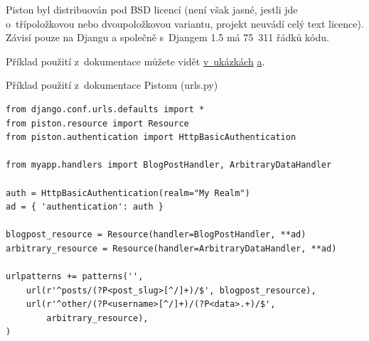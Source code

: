 Piston byl distribuován pod BSD licencí (není však jasné, jestli jde o~třípoložkovou \autocite{BSD3} nebo dvoupoložkovou \autocite{BSD2} variantu, projekt neuvádí celý text licence). Závisí pouze na Djangu a společně s~Djangem 1.5 má 75~311 řádků kódu.

Příklad použití z~dokumentace můžete vidět \protect\hyperlink{code:piston1}{v~ukázkách} \protect\hyperlink{code:piston2}{a}.

\begin{listing}[htbp]
\caption{{\label{code:piston1}Příklad použití z~dokumentace Pistonu (urls.py) \autocite{piston}}}
\begin{verbatim}
from django.conf.urls.defaults import *
from piston.resource import Resource
from piston.authentication import HttpBasicAuthentication

from myapp.handlers import BlogPostHandler, ArbitraryDataHandler

auth = HttpBasicAuthentication(realm="My Realm")
ad = { 'authentication': auth }

blogpost_resource = Resource(handler=BlogPostHandler, **ad)
arbitrary_resource = Resource(handler=ArbitraryDataHandler, **ad)

urlpatterns += patterns('',
    url(r'^posts/(?P<post_slug>[^/]+)/$', blogpost_resource), 
    url(r'^other/(?P<username>[^/]+)/(?P<data>.+)/$',
        arbitrary_resource), 
)
\end{verbatim}
\end{listing}

